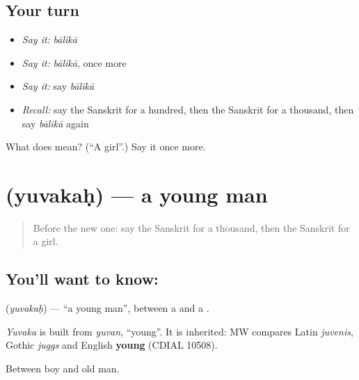 \subsection*{Your turn}
\begin{itemize}
\raggedright
  \item \emph{Say it:} \emph{bālikā}
  \item \emph{Say it:} \emph{bālikā}, once more
  \item \emph{Say it:} say \emph{bālikā}
  \item \emph{Recall:} say the Sanskrit for a hundred, then the Sanskrit for a thousand, then say \emph{bālikā} again
\end{itemize}

\begin{tcolorbox}[breakable,colback=teal!4,colframe=teal!35!black,title={Before you move on}]
What does  mean? (\textquotedblleft{}A girl\textquotedblright{}.) Say it once more.
\end{tcolorbox}
\section[\texorpdfstring{\sk{युवकः} (yuvakaḥ)}{युवकः (yuvakaḥ)}]{ (yuvakaḥ) — a young man}

\label{lesson:SA-C88-youngman}



\begin{quote}
Before the new one: say the Sanskrit for a thousand, then the Sanskrit for a girl.
\end{quote}

\subsection*{You'll want to know: }
\textbf{} (\emph{yuvakaḥ}) — \textquotedblleft{}a young man\textquotedblright{}, between a \textbf{} and a \textbf{}.

\begin{cousinweb}
\emph{Yuvaka} is built from \emph{yuvan}, \textquotedblleft{}young\textquotedblright{}. It is inherited: MW compares Latin \emph{juvenis}, Gothic \emph{juggs} and English \textbf{young} (CDIAL 10508).
\end{cousinweb}

\begin{grammarlens}[title={What you've built}]
Between boy and old man.
\end{grammarlens}

